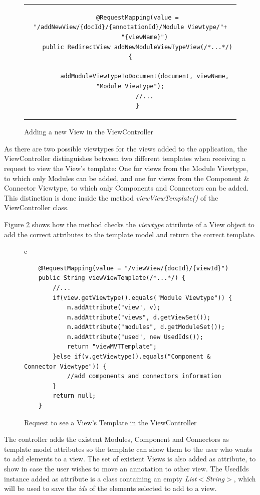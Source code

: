 \begin{figure}[h]
\centering
\lstset{style=customjava}
\begin{tabular}{c}
\begin{lstlisting}
	@RequestMapping(value = "/addNewView/{docId}/{annotationId}/Module Viewtype/"+
		"{viewName}")
	public RedirectView addNewModuleViewTypeView(/*...*/) {
	
		addModuleViewtypeToDocument(document, viewName, "Module Viewtype");
		//...
	}
\end{lstlisting}
\end{tabular}
\caption{Adding a new View in the ViewController}
\label{figure:ViewControllerAddModuleViewtype}
\end{figure}

As there are two possible viewtypes for the views added to the application, the ViewController distinguishes between two different templates when receiving a request to view the View's template: One for views from the Module Viewtype, to which only Modules can be added, and one for views from the Component \& Connector Viewtype, to which only Components and Connectors can be added. This distinction is done inside the method \textit{viewViewTemplate()} of the ViewController class. 

Figure \ref{figure:ViewControllerViewTemplates} shows how the method checks the \textit{viewtype} attribute of a View object to add the correct attributes to the template model and return the correct template.
\begin{figure}[h]
\centering
\lstset{style=customjava}
\begin{tabular}{c}
\begin{lstlisting}
	@RequestMapping(value = "/viewView/{docId}/{viewId}")
	public String viewViewTemplate(/*...*/) {
		//...
		if(view.getViewtype().equals("Module Viewtype")) {
			m.addAttribute("view", v);
			m.addAttribute("views", d.getViewSet());
			m.addAttribute("modules", d.getModuleSet());
			m.addAttribute("used", new UsedIds());
			return "viewMVTTemplate";
		}else if(v.getViewtype().equals("Component & Connector Viewtype")) {
			//add components and connectors information
		}
		return null;
	}	
\end{lstlisting}
\end{tabular}
\caption{Request to see a View's Template in the ViewController}
\label{figure:ViewControllerViewTemplates}
\end{figure}
The controller adds the existent Modules, Component and Connectors as template model attributes so the template can show them to the user who wants to add elements to a view. The set of existent Views is also added as attribute, to show in case the user wishes to move an annotation to other view. The UsedIds instance added as attribute is a class containing an empty \textit{List$<$String$>$}, which will be used to save the \textit{ids} of the elements selected to add to a view. 
 
